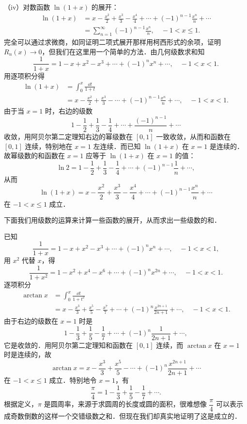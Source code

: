 （iv）对数函数 $\ln(1+x)$ 的展开：
\[
\begin{aligned}
\ln(1+x)&=x-\frac{x^{2}}{2}+\frac{x^{3}}{3}-\frac{x^{4}}{4}+\cdots+(-1)^{n-1}\frac{x^{n}}{n}+\cdots\\
&=\sum_{n=1}^{\infty}(-1)^{n-1}\frac{x^{n}}{n},\quad -1<x\leqslant 1.
\end{aligned}
\]
完全可以通过求微商，如同证明二项式展开那样用柯西形式的余项，证明 $R_{n}(x)\to 0$，但我们在这里用一个简单的方法．由几何级数求和知
\[
\frac{1}{1+x}=1-x+x^{2}-x^{3}+\cdots+(-1)^{n}x^{n}+\cdots,\quad -1<x<1.
\]
用逐项积分得
\[
\begin{aligned}
\ln(1+x)&=\int_{0}^{x}\frac{\dd t}{1+t}\\
&=x-\frac{x^{2}}{2}+\frac{x^{3}}{3}-\cdots+(-1)^{n-1}\frac{x^{n}}{n}+\cdots,\quad -1<x<1.
\end{aligned}
\]
由于当 $x=1$ 时，右边的级数
\[
1-\frac{1}{2}+\frac{1}{3}-\frac{1}{4}+\cdots+\frac{(-1)^{n-1}}{n}+\cdots
\]
收敛，用阿贝尔第二定理知右边的幂级数在 $[0,1]$ 一致收敛，从而和函数在 $[0,1]$ 连续，特别地在 $x=1$ 左连续．而已知 $\ln(1+x)$ 在 $x=1$ 是连续的．故幂级数的和函数在 $x=1$ 应等于 $\ln(1+x)$ 在 $x=1$ 的值：
\[
\ln 2=1-\frac{1}{2}+\frac{1}{3}-\frac{1}{4}+\cdots+(-1)^{n-1}\frac{1}{n}+\cdots,
\]
从而
\[
\ln(1+x)=x-\frac{x^{2}}{2}+\frac{x^{3}}{3}-\frac{x^{4}}{4}+\cdots+(-1)^{n-1}\frac{x^{n}}{n}+\cdots
\]
在 $-1<x\leqslant 1$ 成立．

下面我们用级数的运算来计算一些函数的展开，从而求出一些级数的和．

\begin{example}\label{ex:13-3-2}
已知
\[
\frac{1}{1+x}=1-x+x^{2}-x^{3}+\cdots+(-1)^{n}x^{n}+\cdots,\quad -1<x<1,
\]
用 $x^{2}$ 代替 $x$，得
\[
\frac{1}{1+x^{2}}=1-x^{2}+x^{4}-x^{6}+\cdots+(-1)^{n}x^{2n}+\cdots,\quad -1<x<1.
\]
逐项积分
\[
\begin{aligned}
\arctan x&=\int_{0}^{x}\frac{\dd t}{1+t^{2}}\\
&=x-\frac{x^{3}}{3}+\frac{x^{5}}{5}-\frac{x^{7}}{7}+\cdots+(-1)^{n}\frac{x^{2n+1}}{2n+1}+\cdots,\quad -1<x<1.
\end{aligned}
\]
由于右边的级数在 $x=1$ 时是
\[
1-\frac{1}{3}+\frac{1}{5}-\frac{1}{7}+\cdots+(-1)^{n}\frac{1}{2n+1}+\cdots,
\]
它是收敛的．用阿贝尔第二定理知和函数在 $[0,1]$ 连续，而 $\arctan x$ 在 $x=1$ 时是连续的，故
\[
\arctan x=x-\frac{x^{3}}{3}+\frac{x^{5}}{5}-\cdots+(-1)^{n}\frac{x^{2n+1}}{2n+1}+\cdots
\]
在 $-1<x\leqslant 1$ 成立．特别地令 $x=1$，有
\[
\frac{\pi}{4}=1-\frac{1}{3}+\frac{1}{5}-\frac{1}{7}+\cdots.
\]
根据定义，$\pi$ 是圆周率，来源于求圆周的长度或圆的面积，很难想像 $\dfrac{\pi}{4}$ 可以表示成奇数倒数的这样一个交错级数之和．但现在我们却真实地证明了这是成立的．
\end{example}

